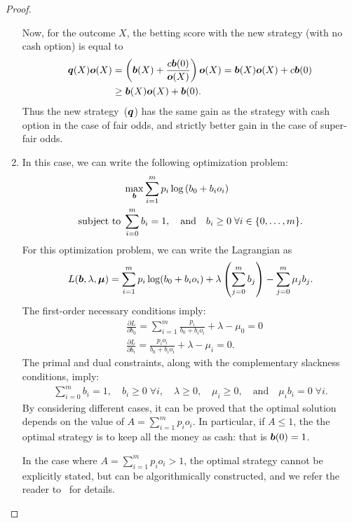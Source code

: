 \begin{proof}
\begin{enumerate}[label=(\alph*)]
            Now, for the outcome $X$, the betting score with the new strategy (with no cash option) is equal to 
            \begin{align}
                \boldsymbol{q}(X) \boldsymbol{o}(X) &= \left( \boldsymbol{b}(X) + \frac{c \boldsymbol{b}(0)}{\boldsymbol{o}(X)} \right) \boldsymbol{o}(X) = \boldsymbol{b}(X) \boldsymbol{o}(X) + c\boldsymbol{b}(0) \\
                & \geq \boldsymbol{b}(X) \boldsymbol{o}(X) + \boldsymbol{b}(0). 
            \end{align}
            Thus the new strategy~($\boldsymbol{q}$) has the same gain as the strategy with cash option in the case of fair odds, and strictly better gain in the case of super-fair odds. 
            \item In this case, we can write the following optimization problem: 
            \begin{align}
                &\max_{\boldsymbol{b}} \sum_{i=1}^m p_i \log \left( b_0 + b_i o_i \right)  \\
                \text{subject to} \; 
                & \sum_{i=0}^m b_i = 1, \quad \text{and} \quad b_i \geq 0 \; \forall i \in \{0, \ldots, m\}. 
            \end{align}
            For this optimization problem, we can write the Lagrangian as 
            \begin{align}
                L(\boldsymbol{b}, \lambda, \boldsymbol{\mu}) = \sum_{i=1}^m p_i \log(b_0 + b_i o_i) + \lambda \left( \sum_{j=0}^m b_j \right) - \sum_{j=0}^m\mu_j b_j. 
            \end{align}
            The first-order necessary conditions imply: 
            \begin{align}
                &\frac{\partial L}{\partial b_0} = \sum_{i=1}^m\frac{p_i}{b_0 + b_i o_i} + \lambda - \mu_0 = 0  \\
                &\frac{\partial L}{\partial b_i} = \frac{p_i o_i}{b_0 + b_i o_i} + \lambda - \mu_i = 0. 
            \end{align}
            The primal and dual constraints, along with the complementary slackness conditions, imply: 
            \begin{align}
                \sum_{i=0}^m b_i = 1, \quad b_i \geq 0\; \forall i, \quad \lambda \geq 0, \quad \mu_i \geq 0, \quad \text{and} \quad \mu_i b_i = 0 \; \forall i. 
            \end{align}
            By considering different cases, it can be proved that the optimal solution depends on the value of $A = \sum_{i=1}^m p_i o_i$. In particular, if $A \leq 1$, the the optimal strategy is to keep all the money as cash: that is $\boldsymbol{b}(0)=1$. 

            In the case where $A = \sum_{i=1}^m p_i o_i > 1$, the optimal strategy cannot be explicitly stated, but can be algorithmically constructed, and we refer the reader to~\citet{kelly1956new} for details. 
        \end{enumerate}
    \end{proof}
    
